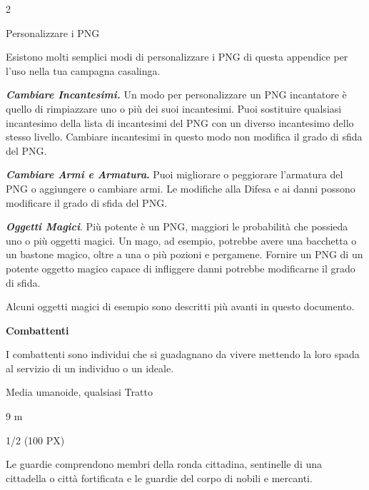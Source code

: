 \begin{multicols}{2}
{Personalizzare i PNG

Esistono molti semplici modi di personalizzare i PNG di questa appendice per l'uso nella tua campagna casalinga.

\emph{\textbf{Cambiare Incantesimi.}} Un modo per personalizzare un PNG incantatore è quello di rimpiazzare uno o più dei suoi incantesimi. Puoi sostituire qualsiasi incantesimo della lista di
incantesimi del PNG con un diverso incantesimo dello stesso livello. Cambiare incantesimi in questo modo non modifica il grado di sfida del PNG.

\textbf{\emph{Cambiare Armi e Armatura}.} Puoi migliorare o peggiorare l'armatura del PNG o aggiungere o cambiare armi. Le modifiche alla Difesa e ai danni possono modificare il grado di sfida del PNG.

\emph{\textbf{Oggetti Magici}}. Più potente è un PNG, maggiori le probabilità che possieda uno o più oggetti magici. Un mago, ad esempio, potrebbe avere una bacchetta o un bastone magico, oltre a una o più pozioni e pergamene. Fornire un PNG di un potente oggetto magico capace di infliggere danni potrebbe modificarne il grado di sfida.

Alcuni oggetti magici di esempio sono descritti più avanti in questo documento.

\textbf{Combattenti}

I combattenti sono individui che si guadagnano da vivere mettendo la loro spada al servizio di un individuo o un ideale.

\begin{description}[noitemsep, topsep=0pt, parsep=0pt, partopsep=0pt, itemsep=1pt, leftmargin=2.35cm,  labelwidth=2.2cm, itemindent=0cm, listparindent=0pt] %
\setlength{\baselineskip}{10pt}
\item[\textbf{Taglia/Tipo}] Media umanoide, qualsiasi Tratto
\item[\textbf{Caratt.}] 
\item[\textbf{Punti Ferita}] 
\item[\textbf{Tiri Salvez.}] 
\item[\textbf{Movimento}] 9 m
\item[\textbf{Sfida}] 1/2 (100 PX)
\end{description}
\smallskip

Le guardie comprendono membri della ronda cittadina, sentinelle di una cittadella o città fortificata e le guardie del corpo di nobili e mercanti.

}
\end{multicols}
